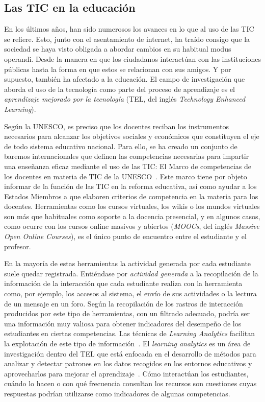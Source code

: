\subsection*{Las TIC en la educación}

En los últimos años, han sido numerosos los avances en lo que al uso de las TIC se refiere. Esto, junto con el asentamiento de internet, ha traído consigo que la sociedad se haya visto obligada a abordar cambios en su habitual modus operandi. Desde la manera en que los ciudadanos interactúan con las instituciones públicas hasta la forma en que estos se relacionan con sus amigos. Y por supuesto, también ha afectado a la educación. El campo de investigación que aborda el uso de la tecnología como parte del proceso de aprendizaje es el \emph{aprendizaje mejorado por la tecnología} (TEL, del inglés \emph{Technology Enhanced Learning}).

Según la UNESCO, es preciso que los docentes reciban los instrumentos necesarios para alcanzar los objetivos sociales y económicos que constituyen el eje de todo sistema educativo nacional. Para ello, se ha creado un conjunto de baremos internacionales que definen las competencias necesarias para impartir una enseñanza eficaz mediante el uso de las TIC: El Marco de competencias de los docentes en materia de TIC de la UNESCO~\cite{midoro2013guidelines}. Este marco tiene por objeto informar de la función de las TIC en la reforma educativa, así como ayudar a los Estados Miembros a que elaboren criterios de competencia en la materia para los docentes. Herramientas como los cursos virtuales, los wikis o los mundos virtuales son más que habituales como soporte a la docencia presencial, y en algunos casos, como ocurre con los cursos online masivos y abiertos (\emph{MOOCs}, del inglés \emph{Massive Open Online Courses}), es el único punto de encuentro entre el estudiante y el profesor.

En la mayoría de estas herramientas la actividad generada por cada estudiante suele quedar registrada. Entiéndase por \emph{actividad generada} a la recopilación de la información de la interacción que cada estudiante realiza con la herramienta como, por ejemplo, los accesos al sistema, el envío de sus actividades o la lectura de un mensaje en un foro. Según \cite{Chebil:2012, Florian:2011} la recopilación de los rastros de interacción producidos por este tipo de herramientas, con un filtrado adecuado, podría ser una información muy valiosa para obtener indicadores del desempeño de los estudiantes en ciertas competencias. Las técnicas de \emph{Learning Analytics} facilitan la explotación de este tipo de información~\cite{conde2015exploring}. El \emph{learning analytics} es un área de investigación dentro del TEL que está enfocada en el desarrollo de métodos para analizar y detectar patrones en los datos recogidos en los entornos educativos y aprovecharlos para mejorar el aprendizaje~\cite{chatti2014learning}.  Cómo interactúan los estudiantes, cuándo lo hacen o con qué frecuencia consultan los recursos son cuestiones cuyas respuestas podrían utilizarse como indicadores de algunas competencias. 

